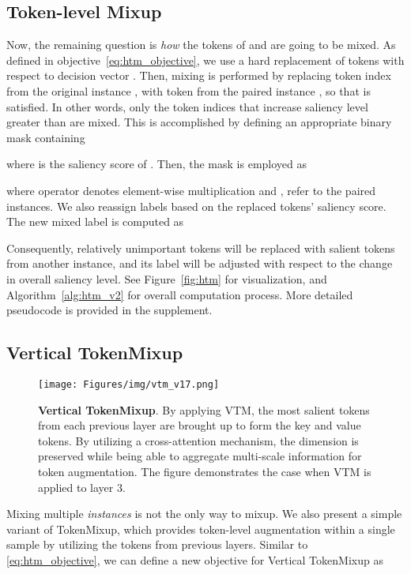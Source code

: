\documentclass{article}
\begin{document}
\subsection{Token-level Mixup}
Now, the remaining question is \textit{how} the tokens of  and  are going to be mixed.
As defined in objective~\eqref{eq:htm_objective}, we use a hard replacement of tokens with respect to decision vector .
Then, mixing is performed by replacing token index  from the original instance , with token  from the paired instance , so that  is satisfied.
In other words, only the token indices that increase saliency level greater than  are mixed.
This is accomplished by defining an appropriate binary mask  containing

where  is the saliency score of .
Then, the mask is employed as 

where operator  denotes element-wise multiplication and ,  refer to the paired instances.
We also reassign labels based on the replaced tokens' saliency score.
The new mixed label is computed as


Consequently, relatively unimportant tokens will be replaced with salient tokens from another instance, and its label will be adjusted with respect to the change in overall saliency level. 
See Figure~\ref{fig:htm} for visualization, and Algorithm~\ref{alg:htm_v2} for overall computation process. 
More detailed pseudocode is provided in the supplement. \subsection{Vertical TokenMixup}

\begin{figure}[t]
\begin{center}
\texttt{[image: Figures/img/vtm\_v17.png]}
\end{center}
\vspace{-4mm}
\caption{\footnotesize \textbf{Vertical TokenMixup}. By applying VTM, the  most salient tokens from each previous layer are brought up to form the key and value tokens. By utilizing a cross-attention mechanism, the dimension is preserved while being able to aggregate multi-scale information for token augmentation. The figure demonstrates the case when VTM is applied to layer 3. }
\label{fig:vtm}
\end{figure} Mixing multiple \textit{instances} is not the only way to mixup.
We also present a simple variant of TokenMixup, which 
provides token-level augmentation within a single sample by utilizing the tokens from previous layers.
Similar to \eqref{eq:htm_objective}, we can define a new objective for Vertical TokenMixup as
\end{document}
